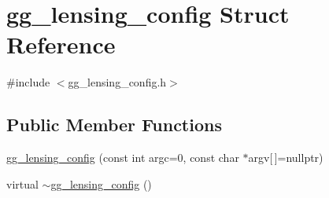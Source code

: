 \hypertarget{structgg__lensing__config}{}\section{gg\+\_\+lensing\+\_\+config Struct Reference}
\label{structgg__lensing__config}


{\ttfamily \#include $<$gg\+\_\+lensing\+\_\+config.\+h$>$}

\subsection*{Public Member Functions}
\begin{DoxyCompactItemize}
\item 
\hyperlink{structgg__lensing__config_a808f3d67c49d7bbcb6e8345fdf6eecdd}{gg\+\_\+lensing\+\_\+config} (const int argc=0, const char $\ast$argv\mbox{[}$\,$\mbox{]}=nullptr)
\item 
virtual \hyperlink{structgg__lensing__config_aec78098e3fa604b03f785edfb2b5066c}{$\sim$gg\+\_\+lensing\+\_\+config} ()
\end{DoxyCompactItemize}
